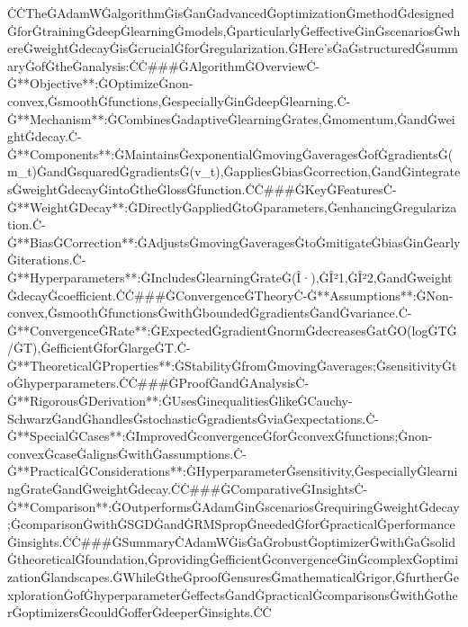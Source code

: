 \documentclass{article}
\begin{document}
ĊĊTheĠAdamWĠalgorithmĠisĠanĠadvancedĠoptimizationĠmethodĠdesignedĠforĠtrainingĠdeepĠlearningĠmodels,ĠparticularlyĠeffectiveĠinĠscenariosĠwhereĠweightĠdecayĠisĠcrucialĠforĠregularization.ĠHere'sĠaĠstructuredĠsummaryĠofĠtheĠanalysis:ĊĊ###ĠAlgorithmĠOverviewĊ-Ġ**Objective**:ĠOptimizeĠnon-convex,ĠsmoothĠfunctions,ĠespeciallyĠinĠdeepĠlearning.Ċ-Ġ**Mechanism**:ĠCombinesĠadaptiveĠlearningĠrates,Ġmomentum,ĠandĠweightĠdecay.Ċ-Ġ**Components**:ĠMaintainsĠexponentialĠmovingĠaveragesĠofĠgradientsĠ(m_t)ĠandĠsquaredĠgradientsĠ(v_t),ĠappliesĠbiasĠcorrection,ĠandĠintegratesĠweightĠdecayĠintoĠtheĠlossĠfunction.ĊĊ###ĠKeyĠFeaturesĊ-Ġ**WeightĠDecay**:ĠDirectlyĠappliedĠtoĠparameters,ĠenhancingĠregularization.Ċ-Ġ**BiasĠCorrection**:ĠAdjustsĠmovingĠaveragesĠtoĠmitigateĠbiasĠinĠearlyĠiterations.Ċ-Ġ**Hyperparameters**:ĠIncludesĠlearningĠrateĠ(Î·),ĠÎ²1,ĠÎ²2,ĠandĠweightĠdecayĠcoefficient.ĊĊ###ĠConvergenceĠTheoryĊ-Ġ**Assumptions**:ĠNon-convex,ĠsmoothĠfunctionsĠwithĠboundedĠgradientsĠandĠvariance.Ċ-Ġ**ConvergenceĠRate**:ĠExpectedĠgradientĠnormĠdecreasesĠatĠO(logĠTĠ/ĠT),ĠefficientĠforĠlargeĠT.Ċ-Ġ**TheoreticalĠProperties**:ĠStabilityĠfromĠmovingĠaverages;ĠsensitivityĠtoĠhyperparameters.ĊĊ###ĠProofĠandĠAnalysisĊ-Ġ**RigorousĠDerivation**:ĠUsesĠinequalitiesĠlikeĠCauchy-SchwarzĠandĠhandlesĠstochasticĠgradientsĠviaĠexpectations.Ċ-Ġ**SpecialĠCases**:ĠImprovedĠconvergenceĠforĠconvexĠfunctions;Ġnon-convexĠcaseĠalignsĠwithĠassumptions.Ċ-Ġ**PracticalĠConsiderations**:ĠHyperparameterĠsensitivity,ĠespeciallyĠlearningĠrateĠandĠweightĠdecay.ĊĊ###ĠComparativeĠInsightsĊ-Ġ**Comparison**:ĠOutperformsĠAdamĠinĠscenariosĠrequiringĠweightĠdecay;ĠcomparisonĠwithĠSGDĠandĠRMSpropĠneededĠforĠpracticalĠperformanceĠinsights.ĊĊ###ĠSummaryĊAdamWĠisĠaĠrobustĠoptimizerĠwithĠaĠsolidĠtheoreticalĠfoundation,ĠprovidingĠefficientĠconvergenceĠinĠcomplexĠoptimizationĠlandscapes.ĠWhileĠtheĠproofĠensuresĠmathematicalĠrigor,ĠfurtherĠexplorationĠofĠhyperparameterĠeffectsĠandĠpracticalĠcomparisonsĠwithĠotherĠoptimizersĠcouldĠofferĠdeeperĠinsights.ĊĊ
\end{document}
